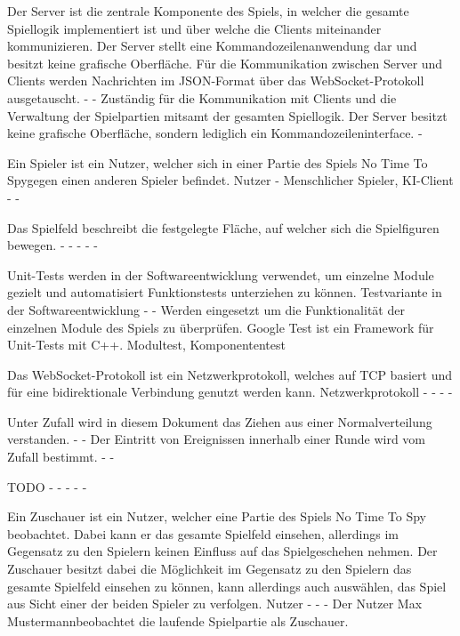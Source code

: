{Der Server ist die zentrale Komponente des Spiels, in welcher die gesamte Spiellogik implementiert ist und über welche die Clients miteinander kommunizieren. Der Server stellt eine Kommandozeilenanwendung dar und besitzt keine grafische Oberfläche. Für die Kommunikation zwischen Server und Clients werden Nachrichten im JSON-Format über das WebSocket-Protokoll ausgetauscht.}
{-}
{-}
{Zuständig für die Kommunikation mit Clients und die Verwaltung der Spielpartien mitsamt der gesamten Spiellogik.}
{Der Server besitzt keine grafische Oberfläche, sondern lediglich ein Kommandozeileninterface.}
{-}

{Ein Spieler ist ein Nutzer, welcher sich in einer Partie des Spiels \glqq No Time To Spy\grqq gegen einen anderen Spieler befindet.}
{Nutzer}
{-}
{Menschlicher Spieler, KI-Client}
{-}
{-}

{Das Spielfeld beschreibt die festgelegte Fläche, auf welcher sich die Spielfiguren bewegen.}
{-}
{-}
{-}
{-}
{-}

{Unit-Tests werden in der Softwareentwicklung verwendet, um einzelne Module gezielt und automatisiert Funktionstests unterziehen zu können.}
{Testvariante in der Softwareentwicklung}
{-}
{-}
{Werden eingesetzt um die Funktionalität der einzelnen Module des Spiels zu überprüfen.}
{Google Test ist ein Framework für Unit-Tests mit C++.}
{Modultest, Komponententest}

{Das WebSocket-Protokoll ist ein Netzwerkprotokoll, welches auf TCP basiert und für eine bidirektionale Verbindung genutzt werden kann.}
{Netzwerkprotokoll}
{-}
{-}
{-}
{-}

{Unter Zufall wird in diesem Dokument das Ziehen aus einer Normalverteilung verstanden.}
{-}
{-}
{Der Eintritt von Ereignissen innerhalb einer Runde wird vom Zufall bestimmt.}
{-}
{-}

{TODO}
{-}
{-}
{-}
{-}
{-}

{Ein Zuschauer ist ein Nutzer, welcher eine Partie des Spiels \glqq{}No Time To Spy\grqq{} beobachtet. Dabei kann er das gesamte Spielfeld einsehen, allerdings im Gegensatz zu den Spielern keinen Einfluss auf das Spielgeschehen nehmen. Der Zuschauer besitzt dabei die Möglichkeit im Gegensatz zu den Spielern das gesamte Spielfeld einsehen zu können, kann allerdings auch auswählen, das Spiel aus Sicht einer der beiden Spieler zu verfolgen.}
{Nutzer}
{-}
{-}
{-}
{Der Nutzer \glqq Max Mustermann\grqq beobachtet die laufende Spielpartie als Zuschauer.}


